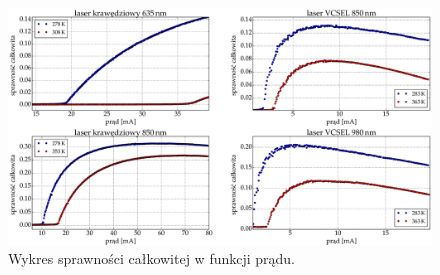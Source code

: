 \begin{figure}
\center
  \includegraphics[scale=0.30]{plot_common/plot_wall_eff.eps}
  \caption{Wykres sprawności całkowitej w funkcji prądu.}
  \label{fig:plot_wall_eff}
\end{figure}
